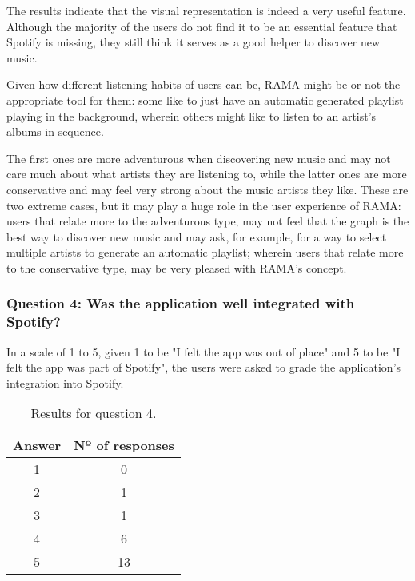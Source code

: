       The results indicate that the visual representation is indeed a very useful feature.
      Although the majority of the users do not find it to be an essential feature that Spotify is missing, they still think it serves as a good helper to discover new music.

      Given how different listening habits of users can be, RAMA might be or not the appropriate tool for them: some like to just have an automatic generated playlist playing in the background, wherein others might like to listen to an artist's albums in sequence.

      The first ones are more adventurous when discovering new music and may not care much about what artists they are listening to, while the latter ones are more conservative and may feel very strong about the music artists they like.
      These are two extreme cases, but it may play a huge role in the user experience of RAMA: users that relate more to the adventurous type, may not feel that the graph is the best way to discover new music and may ask, for example, for a way to select multiple artists to generate an automatic playlist; wherein users that relate more to the conservative type, may be very pleased with RAMA's concept.


    \subsubsection{Question 4: Was the application well integrated with Spotify?}
    \label{ssub:question_4}

      In a scale of 1 to 5, given 1 to be "I felt the app was out of place" and 5 to be "I felt the app was part of Spotify", the users were asked to grade the application's integration into Spotify.

      \begin{table}[hb]
        \begin{center}
          \begin{tabular}{c|c}

            \hline
            \textbf{Answer} & \textbf{Nº of responses} \\
            \hline
            1 & 0 \\
            2 & 1 \\
            3 & 1 \\
            4 & 6 \\
            5 & 13 \\
            \hline
          \end{tabular}
        \end{center}
        \caption{Results for question 4.}
        \label{tab:question4}
       \end{table}

